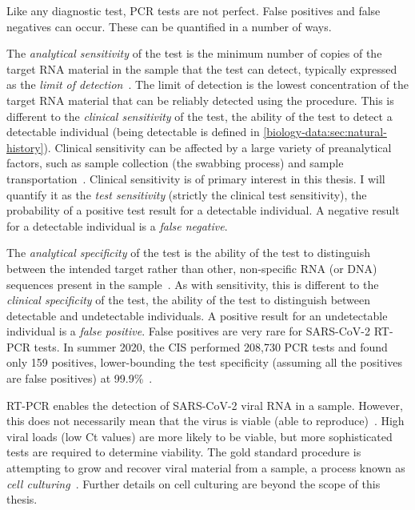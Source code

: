 \documentclass[thesis.tex]{subfiles}
\begin{document}
Like any diagnostic test, PCR tests are not perfect.
False positives and false negatives can occur.
These can be quantified in a number of ways.

The \emph{analytical sensitivity} of the test is the minimum number of copies of the target RNA material in the sample that the test can detect, typically expressed as the \emph{limit of detection}~\autocite{bustinMIQE}.
The limit of detection is the lowest concentration of the target RNA material that can be reliably detected using the procedure.
This is different to the \emph{clinical sensitivity} of the test, the ability of the test to detect a detectable individual (being detectable is defined in \cref{biology-data:sec:natural-history}).
Clinical sensitivity can be affected by a large variety of preanalytical factors, such as sample collection (\ie the swabbing process) and sample transportation~\autocite{lippiPotential}.
Clinical sensitivity is of primary interest in this thesis.
I will quantify it as the \emph{test sensitivity} (strictly the clinical test sensitivity), the probability of a positive test result for a detectable individual.
A negative result for a detectable individual is a \emph{false negative}.

The \emph{analytical specificity} of the test is the ability of the test to distinguish between the intended target rather than other, non-specific RNA (or DNA) sequences present in the sample~\autocite{bustinMIQE}.
As with sensitivity, this is different to the \emph{clinical specificity} of the test, the ability of the test to distinguish between detectable and undetectable individuals.
A positive result for an undetectable individual is a \emph{false positive}.
False positives are very rare for SARS-CoV-2 RT-PCR tests.
In summer 2020, the CIS performed 208,730 PCR tests and found only 159 positives, lower-bounding the test specificity (assuming all the positives are false positives) at 99.9\%~\autocite[section 5]{cisMethodsONS}.

RT-PCR enables the detection of SARS-CoV-2 viral RNA in a sample.
However, this does not necessarily mean that the virus is viable (\ie able to reproduce)~\autocite{puhachSARSCoV2}.
High viral loads (low Ct values) are more likely to be viable, but more sophisticated tests are required to determine viability.
The gold standard procedure is attempting to grow and recover viral material from a sample, a process known as \emph{cell culturing}~\autocite{singanayagamDuration,puhachSARSCoV2,hakkiOnset}.
Further details on cell culturing are beyond the scope of this thesis.
\end{document}
